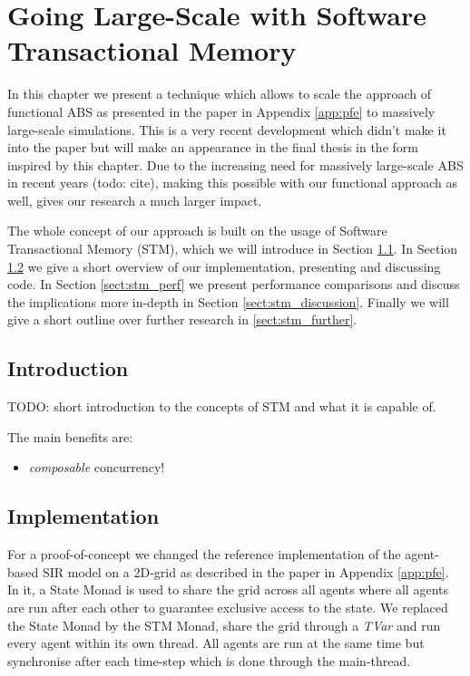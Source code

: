 \chapter{Going Large-Scale with Software Transactional Memory}
\label{chap:stm}

In this chapter we present a technique which allows to scale the approach of functional ABS as presented in the paper in Appendix \ref{app:pfe} to massively large-scale simulations. This is a very recent development which didn't make it into the paper but will make an appearance in the final thesis in the form inspired by this chapter. Due to the increasing need for massively large-scale ABS in recent years (todo: cite), making this possible with our functional approach as well, gives our research a much larger impact.

The whole concept of our approach is built on the usage of Software Transactional Memory (STM), which we will introduce in Section \ref{sect:stm_intro}. In Section \ref{sect:stm_impl} we give a short overview of our implementation, presenting and discussing code. In Section \ref{sect:stm_perf} we present performance comparisons and discuss the implications more in-depth in Section \ref{sect:stm_discussion}. Finally we will give a short outline over further research in \ref{sect:stm_further}.

\section{Introduction}
\label{sect:stm_intro}
TODO: short introduction to the concepts of STM and what it is capable of.

The main benefits are:
\begin{itemize}
	\item \textit{composable} concurrency!
\end{itemize}

\section{Implementation}
\label{sect:stm_impl}
For a proof-of-concept we changed the reference implementation of the agent-based SIR model on a 2D-grid as described in the paper in Appendix \ref{app:pfe}. In it, a State Monad is used to share the grid across all agents where all agents are run after each other to guarantee exclusive access to the state. We replaced the State Monad by the STM Monad, share the grid through a \textit{TVar} and run every agent within its own thread. All agents are run at the same time but synchronise after each time-step which is done through the main-thread.

